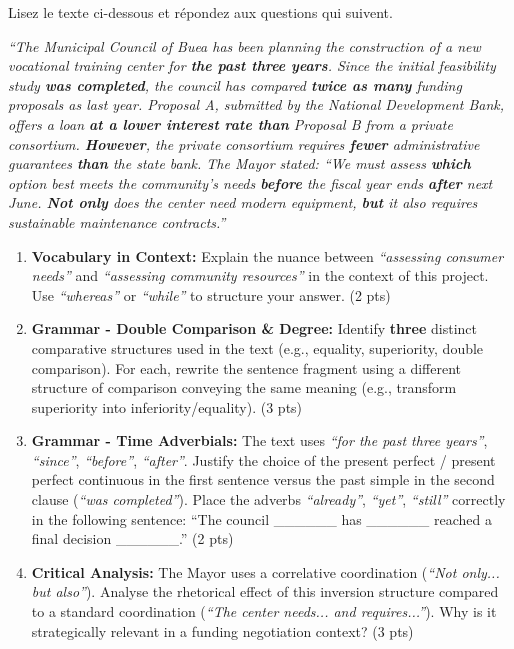 \documentclass[11pt]{article}
\begin{document}
\begin{exercice}
Lisez le texte ci-dessous et répondez aux questions qui suivent.

\textit{``The Municipal Council of Buea has been planning the construction of a new vocational training center for \textbf{the past three years}. Since the initial feasibility study \textbf{was completed}, the council has compared \textbf{twice as many} funding proposals as last year. Proposal A, submitted by the National Development Bank, offers a loan \textbf{at a lower interest rate than} Proposal B from a private consortium. \textbf{However}, the private consortium requires \textbf{fewer} administrative guarantees \textbf{than} the state bank. The Mayor stated: ``We must assess \textbf{which} option best meets the community's needs \textbf{before} the fiscal year ends \textbf{after} next June. \textbf{Not only} does the center need modern equipment, \textbf{but} it also requires sustainable maintenance contracts.''}

\begin{enumerate}
    \item \textbf{Vocabulary in Context:} Explain the nuance between \textit{``assessing consumer needs''} and \textit{``assessing community resources''} in the context of this project. Use \textit{``whereas''} or \textit{``while''} to structure your answer. (2 pts)
    \item \textbf{Grammar - Double Comparison \& Degree:} Identify \textbf{three} distinct comparative structures used in the text (e.g., equality, superiority, double comparison). For each, rewrite the sentence fragment using a different structure of comparison conveying the same meaning (e.g., transform superiority into inferiority/equality). (3 pts)
    \item \textbf{Grammar - Time Adverbials:} The text uses \textit{``for the past three years''}, \textit{``since''}, \textit{``before''}, \textit{``after''}. Justify the choice of the present perfect / present perfect continuous in the first sentence versus the past simple in the second clause (\textit{``was completed''}). Place the adverbs \textit{``already''}, \textit{``yet''}, \textit{``still''} correctly in the following sentence: ``The council \_\_\_\_\_\_ has \_\_\_\_\_\_ reached a final decision \_\_\_\_\_\_.'' (2 pts)
    \item \textbf{Critical Analysis:} The Mayor uses a correlative coordination (\textit{``Not only... but also''}). Analyse the rhetorical effect of this inversion structure compared to a standard coordination (\textit{``The center needs... and requires...''}). Why is it strategically relevant in a funding negotiation context? (3 pts)
\end{enumerate}
\end{exercice}
\end{document}

